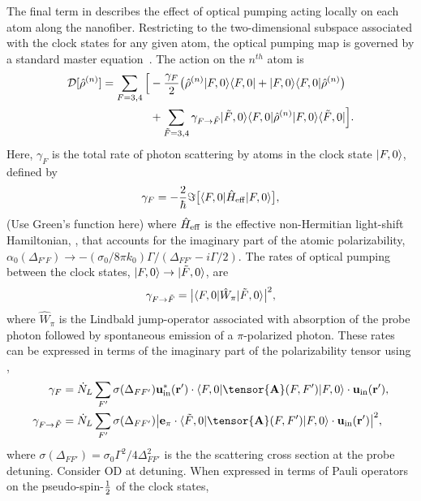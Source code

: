 \documentclass[preprint,aps,pra,onecolumn]{revtex4-1} %
\newcommand{\inp}{{\rm in}}
\newcommand{\charpol}{\alpha_0(\Delta_{F'F})}
\newcommand{\half}{\smallfrac{1}{2}}
\newcommand{\comment}[1]{{\color{Maroon} #1}}
\begin{document}
The final term in  describes the effect of optical pumping acting locally on each atom along the nanofiber. Restricting to the two-dimensional subspace associated with the clock states for any given atom, the optical pumping map is governed by a standard master equation~\cite{deutsch_quantum_2010}.  The action on the $n^{th}$ atom is
	\begin{align}
		\mathcal{D}[\hat{\rho}^{(n)}] =  \sum_{F=3,4} \Big[& -\frac{\gamma_{F}}{2} \big( \hat{\rho}^{(n)} \lvert{F,0}\rangle\langle{F,0}\rvert + \lvert{F,0}\rangle\langle{F,0}\rvert \hat{\rho}^{(n)} \big) \\
		&+  \sum_{\tilde{F} =3,4}  \gamma_{F \rightarrow \tilde{F}} \lvert{\tilde{F},0}\rangle\langle{F,0}\rvert \hat{\rho}^{(n)} \lvert{F,0}\rangle\langle{\tilde{F},0}\rvert \Big].\nonumber
	\end{align}
Here, $\gamma_{F}$ is the total rate of photon scattering by atoms in the clock state $\lvert{F,0}\rangle$, defined by
	\begin{equation}
		\gamma_{F}=- \frac{2}{\hbar} \Im \big[ \langle{F,0}\rvert \hat{H}_{\rm eff}\lvert{F,0}\rangle \big] ,
	\end{equation}
\comment{(Use Green's function here)} where $\hat{H}_{\text{eff}}$ is the effective non-Hermitian light-shift Hamiltonian, , that accounts for the imaginary part of the atomic polarizability, $\charpol \rightarrow -(\sigma_0/8\pi k_0) \Gamma/(\Delta_{FF'}-i\Gamma/2)$. The rates of optical pumping between the clock states, $\lvert{F,0}\rangle \rightarrow \lvert{\tilde{F},0}\rangle$, are
	\begin{equation}
		\gamma_{F \rightarrow \tilde{F} } =\big| \langle{F,0}\rvert \hat{W}_\pi \lvert{\tilde{F},0}\rangle \big|^2,
	\end{equation}
where $\hat{W}_\pi$ is the Lindbald jump-operator associated with absorption of the probe photon followed by spontaneous emission of a $\pi$-polarized photon.  These rates can be expressed in terms of the imaginary part of the polarizability tensor using ,
	\begin{align}
		\gamma_F &=\dot{N}_L  \sum_{F'} \sigma (\Delta_{FF'} ) \mathbf{u}^*_\inp(\br')\cdot \bra{F,0} \tensor{\mathbf{A}}(F,F') \ket{F,0}  \cdot \mathbf{u}_\inp(\br'), \\
		\gamma_{F \rightarrow \tilde{F}}&=  \dot{N}_L  \sum_{F'} \sigma (\Delta_{FF'}) \big| \mathbf{e}_\pi\cdot \bra{\tilde{F},0} \tensor{\mathbf{A}}(F,F') \ket{F,0}  \cdot \mathbf{u}_\inp(\br') \big|^2 ,
	\end{align}
where $ \sigma (\Delta_{FF'} )  = \sigma_0 \Gamma^2/4\Delta^2_{FF'}$ is the the scattering cross section at the probe detuning. \comment{Consider OD at detuning.} When expressed in terms of Pauli operators on the pseudo-spin-$\half$ of the clock states,
\end{document}
